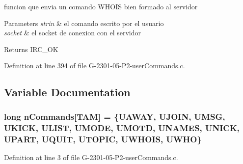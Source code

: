 funcion que envia un comando W\-H\-O\-I\-S bien formado al servidor 


\begin{DoxyParams}{Parameters}
{\em strin} & el comando escrito por el usuario \\
\hline
{\em socket} & el socket de conexion con el servidor\\
\hline
\end{DoxyParams}
\begin{DoxyReturn}{Returns}
I\-R\-C\-\_\-\-O\-K 
\end{DoxyReturn}


Definition at line 394 of file G-\/2301-\/05-\/\-P2-\/user\-Commands.\-c.



\subsection{Variable Documentation}
\hypertarget{_g-2301-05-_p2-user_commands_8c_aef124ac385578c5a6c3308a917fee8ad}{
\subsubsection[{n\-Commands}]{\setlength{\rightskip}{0pt plus 5cm}long n\-Commands\mbox{[}{\bf T\-A\-M}\mbox{]} = \{U\-A\-W\-A\-Y, U\-J\-O\-I\-N, U\-M\-S\-G, U\-K\-I\-C\-K, U\-L\-I\-S\-T, U\-M\-O\-D\-E, U\-M\-O\-T\-D, U\-N\-A\-M\-E\-S, U\-N\-I\-C\-K, U\-P\-A\-R\-T, U\-Q\-U\-I\-T, U\-T\-O\-P\-I\-C, U\-W\-H\-O\-I\-S, U\-W\-H\-O\}}}\label{_g-2301-05-_p2-user_commands_8c_aef124ac385578c5a6c3308a917fee8ad}


Definition at line 3 of file G-\/2301-\/05-\/\-P2-\/user\-Commands.\-c.

